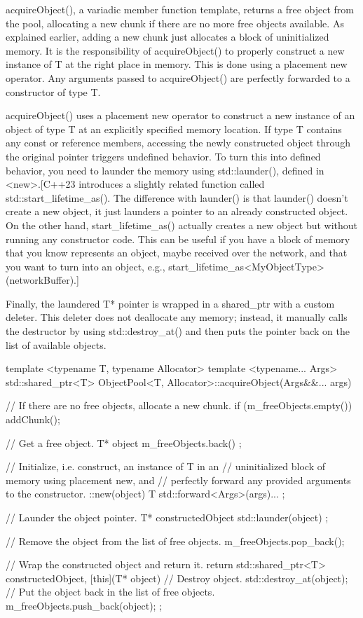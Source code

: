 acquireObject(), a variadic member function template, returns a free object from the pool, allocating a new chunk if there are no more free objects available. As explained earlier, adding a new chunk just allocates a block of uninitialized memory. It is the responsibility of acquireObject() to properly construct a new instance of T at the right place in memory. This is done using a placement new operator. Any arguments passed to acquireObject() are perfectly forwarded to a constructor of type T.

acquireObject() uses a placement new operator to construct a new instance of an object of type T at an explicitly specified memory location. If type T contains any const or reference members, accessing the newly constructed object through the original pointer triggers undefined behavior. To turn this into defined behavior, you need to launder the memory using std::launder(), defined in <new>.[C++23 introduces a slightly related function called std::start\_lifetime\_as(). The difference with launder() is that launder() doesn’t create a new object, it just launders a pointer to an already constructed object. On the other hand, start\_lifetime\_as() actually creates a new object but without running any constructor code. This can be useful if you have a block of memory that you know represents an object, maybe received over the network, and that you want to turn into an object, e.g., start\_lifetime\_as<MyObjectType>(networkBuffer).]

Finally, the laundered T* pointer is wrapped in a shared\_ptr with a custom deleter. This deleter does not deallocate any memory; instead, it manually calls the destructor by using std::destroy\_at() and then puts the pointer back on the list of available objects.

\begin{cpp}
template <typename T, typename Allocator>
template <typename... Args>
std::shared_ptr<T> ObjectPool<T, Allocator>::acquireObject(Args&&... args)
{
    // If there are no free objects, allocate a new chunk.
    if (m_freeObjects.empty()) { addChunk(); }

    // Get a free object.
    T* object { m_freeObjects.back() };

    // Initialize, i.e. construct, an instance of T in an
    // uninitialized block of memory using placement new, and
    // perfectly forward any provided arguments to the constructor.
    ::new(object) T { std::forward<Args>(args)... };

    // Launder the object pointer.
    T* constructedObject { std::launder(object) };

    // Remove the object from the list of free objects.
    m_freeObjects.pop_back();

    // Wrap the constructed object and return it.
    return std::shared_ptr<T> { constructedObject, [this](T* object) {
        // Destroy object.
        std::destroy_at(object);
        // Put the object back in the list of free objects.
        m_freeObjects.push_back(object);
    } };
}
\end{cpp}

